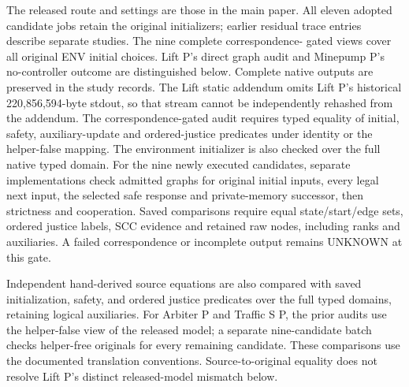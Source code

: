 The released route and settings are those in the main paper. All eleven
adopted candidate jobs retain the original initializers; earlier residual
trace entries describe separate studies. The nine complete correspondence-
gated views cover all original ENV initial choices. Lift P's direct graph
audit and Minepump P's no-controller outcome are distinguished below. Complete
native outputs are preserved in the study records. The Lift static addendum
omits Lift P's historical 220,856,594-byte stdout, so that stream cannot
be independently rehashed from the addendum. The correspondence-gated audit requires typed equality
of initial, safety, auxiliary-update and ordered-justice predicates under
identity or the helper-false mapping. The environment initializer is also
checked over the full native typed domain. For the nine newly executed
candidates, separate implementations check admitted graphs for original initial inputs,
every legal next input, the selected safe response
and private-memory successor, then strictness and cooperation. Saved
comparisons require equal state/start/edge sets, ordered justice labels,
SCC evidence and retained raw nodes, including ranks and auxiliaries.
A failed correspondence or incomplete output remains UNKNOWN at this gate.

Independent hand-derived source equations are also compared with saved
initialization, safety, and ordered justice predicates over the full
typed domains, retaining logical auxiliaries. For Arbiter P and Traffic S P,
the prior audits use the helper-false view of the released model;
a separate nine-candidate batch checks helper-free originals for every
remaining candidate. These comparisons use the documented translation
conventions. Source-to-original equality does not resolve Lift P's
distinct released-model mismatch below.


